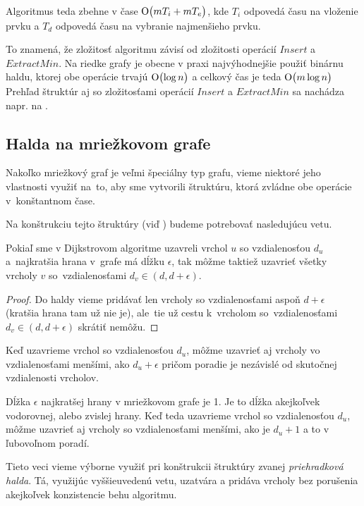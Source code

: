 Algoritmus teda zbehne v čase $\operatorname{O}\bigl(m T_i + m T_e\bigr)$, kde $T_i$ odpovedá času na vloženie prvku a $T_d$ odpovedá času na vybranie najmenšieho prvku.

To znamená, že zložitosť algoritmu závisí od zložitosti operácií $Insert$ a $ExtractMin$. Na riedke grafy je obecne v praxi najvýhodnejšie použiť 
binárnu haldu, ktorej obe operácie trvajú $\operatorname{O}\bigl(\log{n} \bigr) $ a celkový čas je teda $\operatorname{O}\bigl(m\log{n}\bigr)$
Prehľad štruktúr aj so zložitosťami operácií $Insert$ a $ExtractMin$ sa nachádza napr. na \cite{mares07}.

\subsection{Halda na mriežkovom grafe}
Nakoľko mriežkový graf je veľmi špeciálny typ grafu,
vieme niektoré jeho vlastnosti využiť na~to, aby sme vytvorili štruktúru, ktorá zvládne obe operácie v~konštantnom čase. 


Na konštrukciu tejto štruktúry (viď \cite{gs97}) budeme potrebovať nasledujúcu vetu.

\begin{theorem}
Pokiaľ sme v Dijkstrovom algoritme uzavreli vrchol $u$ so vzdialenosťou $d_u$ a~najkratšia hrana v~grafe má dĺžku $\epsilon$, tak môžme taktiež 
uzavrieť všetky vrcholy $v$ so~vzdialenosťami $d_v \in (d, d + \epsilon)$.
\end{theorem}
\begin{proof}
Do haldy vieme pridávať len vrcholy so vzdialenosťami aspoň $d + \epsilon$ (kratšia hrana tam už nie je), 
ale~tie už cestu k~vrcholom so~vzdialenosťami
$d_v \in (d, d + \epsilon)$ skrátiť nemôžu.
\end{proof}


\begin{consequence}
Keď uzavrieme vrchol so vzdialenosťou $d_u$, môžme uzavrieť aj vrcholy vo vzdialenosťami menšími, ako $d_u + \epsilon$
pričom poradie je nezávislé od skutočnej vzdialenosti vrcholov.
\end{consequence}

\begin{example}
\label{ex:length}
Dĺžka $\epsilon$ najkratšej hrany v mriežkovom grafe je 1. Je to dĺžka akejkoľvek vodorovnej, alebo zvislej hrany.
Keď teda uzavrieme vrchol so vzdialenosťou $d_u$, môžme uzavrieť aj vrcholy so vzdialenosťami menšími, ako je $d_u + 1$ a to v ľubovoľnom poradí.
\end{example}

Tieto veci vieme výborne využiť pri konštrukcii štruktúry
zvanej {\sl priehradková halda}. Tá, využijúc vyššieuvedenú vetu, uzatvára a pridáva vrcholy bez porušenia akejkoľvek konzistencie behu algoritmu.

